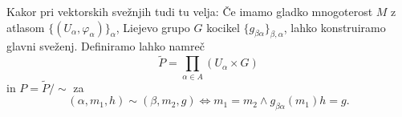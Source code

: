 Kakor pri vektorskih svežnjih tudi tu velja:
Če imamo gladko mnogoterost $M$ z atlasom $\{(U_\alpha,
\varphi_\alpha)\}_\alpha$, Liejevo grupo $G$ kocikel $\{g_{\beta
  \alpha}\}_{\beta, \alpha}$, lahko konstruiramo glavni sveženj.
Definiramo lahko namreč
\[
  \tilde{P} = \prod_{\alpha \in A} (U_\alpha \times G)
\]
in $P = \tilde{P} / \sim$ za
\[
  (\alpha, m_1, h) \sim (\beta, m_2, g)
  \iff m_1 = m_2 \land g_{\beta \alpha}(m_1) h = g.
\]

